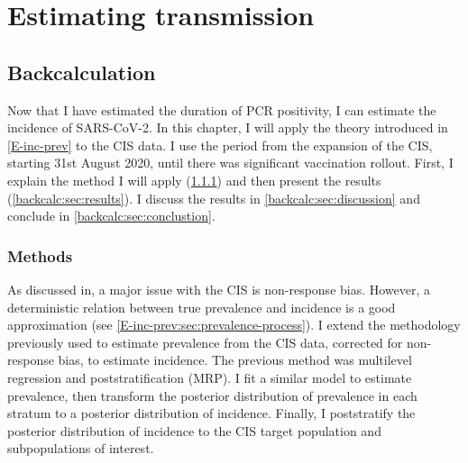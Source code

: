 \documentclass[thesis.tex]{subfiles}
\begin{document}
\ifSubfilesClassLoaded{
    \setcounter{chapter}{6}
}

\chapter{Estimating transmission} \label{transmission}

\section{Backcalculation} \label{backcalc}

Now that I have estimated the duration of PCR positivity, I can estimate the incidence of SARS-CoV-2.
In this chapter, I will apply the theory introduced in \cref{E-inc-prev} to the CIS data.
I use the period from the expansion of the CIS, starting 31st August 2020, until there was significant vaccination rollout.
First, I explain the method I will apply (\cref{backcalc:sec:methods}) and then present the results (\cref{backcalc:sec:results}).
I discuss the results in \cref{backcalc:sec:discussion} and conclude in \cref{backcalc:sec:conclustion}.


\subsection{Methods} \label{backcalc:sec:methods}

As discussed in, a major issue with the CIS is non-response bias.
However, a deterministic relation between true prevalence and incidence is a good approximation (see \cref{E-inc-prev:sec:prevalence-process}).
I extend the methodology previously used to estimate prevalence from the CIS data, corrected for non-response bias, to estimate incidence.
The previous method was multilevel regression and poststratification (MRP).
I fit a similar model to estimate prevalence, then transform the posterior distribution of prevalence in each stratum to a posterior distribution of incidence.
Finally, I poststratify the posterior distribution of incidence to the CIS target population and subpopulations of interest.
\end{document}
